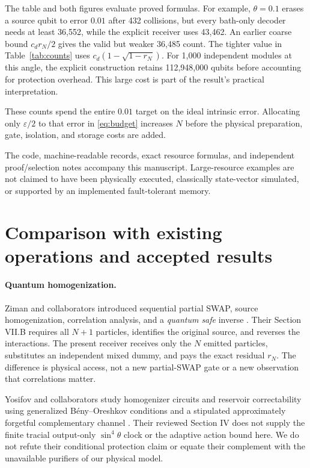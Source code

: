 \documentclass[11pt]{article}
\numberwithin{equation}{section}
\theoremstyle{remark}
\newcommand{\eps}{\varepsilon}
\begin{document}
The table and both figures evaluate proved formulas. For example,
\(\theta=0.1\) erases a source qubit to error \(0.01\) after 432 collisions,
but every bath-only decoder needs at least 36,552, while the explicit receiver
uses 43,462. An earlier coarse bound \(c_dr_N/2\) gives the valid but weaker
36,485 count. The tighter value in Table~\ref{tab:counts} uses
\(c_d(1-\sqrt{1-r_N})\).
For 1,000 independent modules at this angle, the explicit construction
retains 112,948,000 qubits before accounting for protection overhead. This
large cost is part of the result's practical interpretation.

These counts spend the entire \(0.01\) target on the ideal intrinsic error.
Allocating only \(\eps/2\) to that error in \eqref{eq:budget} increases \(N\)
before the physical preparation, gate, isolation, and storage costs are added.

The code, machine-readable records, exact resource formulas, and independent
proof/selection notes accompany this manuscript. Large-resource examples are
not claimed to have been physically executed, classically state-vector
simulated, or supported by an implemented fault-tolerant memory.

\section{Comparison with existing operations and accepted results}
\label{sec:prior}
\paragraph{Quantum homogenization.}
Ziman and collaborators introduced sequential partial SWAP, source
homogenization, correlation analysis, and a \emph{quantum safe} inverse
\cite{Ziman}. Their Section VII.B requires all \(N+1\) particles, identifies
the original source, and reverses the interactions. The present receiver
receives only the \(N\) emitted particles, substitutes an independent mixed
dummy, and pays the exact residual \(r_N\). The difference is physical access,
not a new partial-SWAP gate or a new observation that correlations matter.

Yosifov and collaborators study homogenizer circuits and reservoir
correctability using generalized B\'eny--Oreshkov conditions and a stipulated
approximately forgetful complementary channel \cite{Yosifov}.
Their reviewed Section IV does not supply the finite tracial output-only
\(\sin^4\theta\) clock or the adaptive action bound here. We do not refute
their conditional protection claim or equate their complement with the
unavailable purifiers of our physical model.
\end{document}
